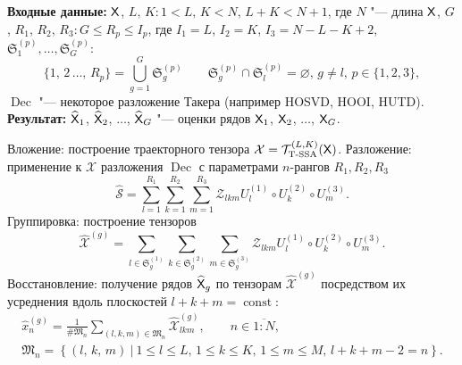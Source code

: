 \documentclass[specialist,
  substylefile = spbu.rtx,
subf,href,colorlinks=true, 12pt]{disser}
\theoremstyle{plain}
\theoremstyle{definition}
\theoremstyle{remark}
\newcommand{\Input}{\textbf{Входные данные: }}
\newcommand{\Output}{\textbf{Результат: }}
\def\newdecomp/{HUTD}
\def\tssa/{Tucker-SSA}
\begin{document}
\begin{algorithm}[!ht]
  \caption{\tssa/ для разделения компонент сигнала.}
  \label{alg:tssa-components}
  \Input $\mathsf{X}$, $L,\,K: 1< L,\,K < N,\, L + K < N + 1$, где $N$ "---
  длина $\mathsf{X}$, $G$, \linebreak $R_1$, $R_2$, $R_3: G \leqslant R_p\leqslant
  I_p$, где $I_1 = L$, $I_2 = K$, $I_3 = N - L - K + 2$,
  $\mathfrak{S}_1^{(p)}, \ldots, \mathfrak{S}_G^{(p)}$:
  \[
    \{1,\, 2\,\ldots,\, R_p\}=\bigcup_{g=1}^{G}\mathfrak{S}_g^{(p)} \qquad
    \mathfrak{S}_g^{(p)}\cap \mathfrak{S}_l^{(p)} =\varnothing,\,
    g\ne l,\, p \in \{1, 2, 3\},
  \]
  $\operatorname{Dec}$ "--- некоторое разложение Такера (например HOSVD,
  HOOI, \newdecomp/).\\
  \Output $\widehat{\mathsf{X}}_1$, $\widehat{\mathsf{X}}_2$, $\ldots$,
  $\widehat{\mathsf{X}}_G$ "--- оценки рядов
  $\mathsf{X}_1$, $\mathsf{X}_2$, $\ldots$, $\mathsf{X}_G$.
  \begin{algorithmic}[1]
    \State \label{algstep:tssa-inj}
    Вложение: построение траекторного тензора $\mathcal{X}
    =\mathcal{T}_{\textrm{T-SSA}}^{(L, K)} (\mathsf{X})$.
    \State \label{algstep:tssa-decomp}
    Разложение: применение к $\mathcal{X}$ разложения $\operatorname{Dec}$ с
    параметрами $n$-рангов $R_1, R_2, R_3$
    \begin{equation}
      \widehat{\mathcal{S}}=\sum_{l=1}^{R_1} \sum_{k=1}^{R_2} \sum_{m=1}^{R_3}
      \mathcal{Z}_{lkm} U^{(1)}_{l}
      \circ U^{(2)}_{k} \circ U^{(3)}_{m}.
      \label{eq:trajectory-hosvd}
    \end{equation}
    \State Группировка: построение тензоров
    \begin{equation*}
      \widehat{\mathcal{X}}^{(g)}=\sum_{l \in \mathfrak{S}_g^{(1)}} \sum_{k\in
      \mathfrak{S}_g^{(2)}}
      \sum_{m\in \mathfrak{S}_g^{(3)}}
      \mathcal{Z}_{lkm} U^{(1)}_{l}\circ U^{(2)}_{k} \circ U^{(3)}_{m}.
    \end{equation*}
    \State Восстановление: получение рядов $\widehat{\mathsf{X}}_g$ по тензорам
    $\widehat{\mathcal{X}}^{(g)}$ посредством их усреднения вдоль
    плоскостей $l+k+m=\operatorname{const}$:
    \begin{gather*}
      \hat{x}^{(g)}_n=\frac{1}{\#\mathfrak{M}_n}\sum_{(l,k,m)\in
      \mathfrak{M}_n} \widehat{\mathcal{X}}^{(g)}_{lkm},\qquad n\in
      \overline{1:N},         \\
      \mathfrak{M}_n=\left\{(l,\, k,\, m)~\Big|~1\leqslant l
        \leqslant L,\, 1\leqslant k \leqslant K,\, 1\leqslant m
      \leqslant M,\, l+k+m-2=n\right\}.
    \end{gather*}
  \end{algorithmic}
\end{algorithm}
\end{document}
